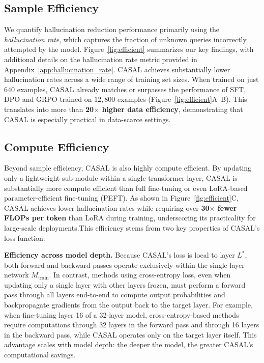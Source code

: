 \documentclass{article} %
\begin{document}
\subsection{Sample Efficiency}
We quantify hallucination reduction performance primarily using the \emph{hallucination rate}, which captures the fraction of unknown queries incorrectly attempted by the model. Figure~\ref{fig:efficient} summarizes our key findings, with additional details on the hallucination rate metric provided in Appendix~\ref{app:hallucination_rate}.
CASAL achieves substantially lower hallucination rates across a wide range of training set sizes. When trained on just $640$ examples, CASAL already matches or surpasses the performance of SFT, DPO and GRPO trained on $12{,}800$ examples (Figure~\ref{fig:efficient}A–B). This translates into more than \textbf{20$\times$ higher data efficiency}, demonstrating that CASAL is especially practical in data-scarce settings.

\subsection{Compute Efficiency}
Beyond sample efficiency, CASAL is also highly compute efficient. By updating only a lightweight sub-module within a single transformer layer, CASAL is substantially more compute efficient than full fine-tuning or even LoRA-based parameter-efficient fine-tuning (PEFT). As shown in Figure~\ref{fig:efficient}C, CASAL achieves lower hallucination rates while requiring over \textbf{30$\times$ fewer FLOPs per token} than LoRA during training, underscoring its practicality for large-scale deployments.This efficiency stems from two key properties of CASAL's loss function:

\textbf{Efficiency across model depth.} Because CASAL's loss is local to layer $L^*$, both forward and backward passes operate exclusively within the single-layer network $M_\text{train}$. In contrast, methods using cross-entropy loss, even when updating only a single layer with other layers frozen, must perform a forward pass through all layers end-to-end to compute output probabilities and backpropagate gradients from the output back to the target layer. For example, when fine-tuning layer 16 of a 32-layer model, cross-entropy-based methods require computations through 32 layers in the forward pass and through 16 layers in the backward pass, while CASAL operates only on the target layer itself. This advantage scales with model depth: the deeper the model, the greater CASAL's computational savings.
\end{document}

